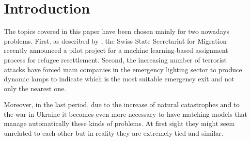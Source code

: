 \section{Introduction}\label{introduction}


The topics covered in this paper have been chosen mainly for two nowadays problems. First, as described by \citet{olbergml}, the Swiss State Secretariat for Migration recently announced a pilot project for a machine learning-based assignment process for refugee resettlement. Second, the increasing number of terrorist attacks have forced main companies in the emergency lighting sector to produce dynamic lamps to indicate which is the most suitable emergency exit and not only the nearest one.

Moreover, in the last period, due to the increase of natural catastrophes and to the war in Ukraine it becomes even more necessary to have matching models that manage automatically  these kinds of problems. At first sight they might seem unrelated to each other but in reality they are extremely tied and similar.

